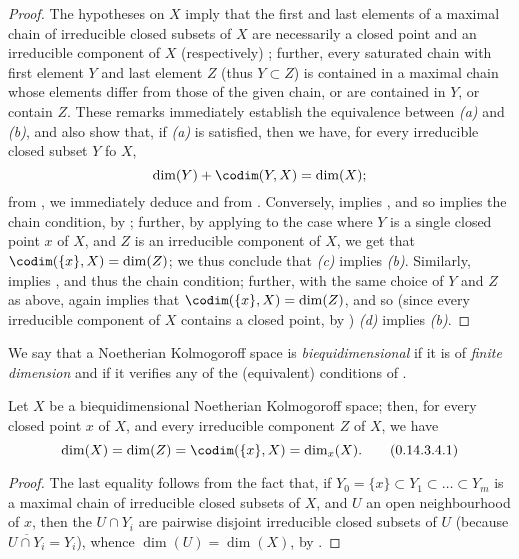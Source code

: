 \begin{proof}
\label{proof-0.14.3.3}
The hypotheses on $X$ imply that the first and last elements of a maximal chain of irreducible closed subsets of $X$ are necessarily a closed point and an irreducible component of $X$ (respectively) ;
further, every saturated chain with first element $Y$ and last element $Z$ (thus $Y\subset Z$) is contained in a maximal chain whose elements differ from those of the given chain, or are contained in $Y$, or contain $Z$.
These remarks immediately establish the equivalence between \emph{(a)} and \emph{(b)}, and also show that, if \emph{(a)} is satisfied, then we have, for every irreducible closed subset $Y$ fo $X$,
\begin{equation*}
\label{0.14.3.3.3}
    \dim(Y)+\codim(Y,X) = \dim(X);
\end{equation*}
from , we immediately deduce  and  from .
Conversely,  implies , and so  implies the chain condition, by ;
further, by applying  to the case where $Y$ is a single closed point $x$ of $X$, and $Z$ is an irreducible component of $X$, we get that $\codim(\{x\},X)=\dim(Z)$;
we thus conclude that \emph{(c)} implies \emph{(b)}.
Similarly,  implies , and thus the chain condition;
further, with the same choice of $Y$ and $Z$ as above,  again implies that $\codim(\{x\},X)=\dim(Z)$, and so (since every irreducible component of $X$ contains a closed point, by ) \emph{(d)} implies \emph{(b)}.
\end{proof}

We say that a Noetherian Kolmogoroff space is \emph{biequidimensional} if it is of \emph{finite dimension} and if it verifies any of the (equivalent) conditions of .

\begin{cor}[14.3.4]
\label{0.14.3.4}
Let $X$ be a biequidimensional Noetherian Kolmogoroff space;
then, for every closed point $x$ of $X$, and every irreducible component $Z$ of $X$, we have
\begin{equation*}
\label{0.14.3.4.1}
    \dim(X) = \dim(Z) = \codim(\{x\},X) = \dim_x(X).\tag{0.14.3.4.1}
\end{equation*}
\end{cor}

\begin{proof}
\label{proof-0.14.3.4}
The last equality follows from the fact that, if $Y_0=\{x\}\subset Y_1\subset\ldots\subset Y_m$ is a maximal chain of irreducible closed subsets of $X$, and $U$ an open neighbourhood of $x$, then the $U\cap Y_i$ are pairwise disjoint irreducible closed subsets of $U$ (because $\overline{U\cap Y_i}=Y_i$), whence $\dim(U)=\dim(X)$, by .
\end{proof}

